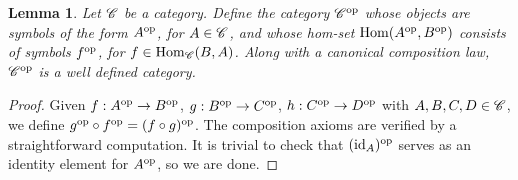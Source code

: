 \documentclass{article}
\newtheorem{lemma}{Lemma}[section]
\theoremstyle{definition}
\numberwithin{figure}{section}
\begin{document}
\begin{lemma} Let $\mathscr{C}$ be a category. Define the category $\mathscr{C}^{\mathrm{op}}$ whose objects are symbols of the form $A^{\mathrm{op}}$, for $A\in \mathscr{C}$, and whose hom-set $\mathrm{Hom}(A^{\mathrm{op}},B^{\mathrm{op}})$ consists of symbols $f^{\mathrm{op}}$, for $f\in \mathrm{Hom}_{\mathscr{C}}(B,A)$. Along with a canonical composition law, $\mathscr{C}^{\mathrm{op}}$ is a well defined category.
\end{lemma}
\begin{proof} Given $f:A^{\mathrm{op}}\to B^{\mathrm{op}}$, $g:B^{\mathrm{op}}\to C^{\mathrm{op}}$, $h:C^{\mathrm{op}}\to D^{\mathrm{op}}$ with $A,B,C,D\in \mathscr{C}$, we define $g^{\mathrm{op}}\circ f^{\mathrm{op}}=(f\circ g)^{\mathrm{op}}$. The composition axioms are verified by a straightforward computation. It is trivial to check that $(\mathrm{id}_A)^{\mathrm{op}}$ serves as an identity element for $A^{\mathrm{op}}$, so we are done.
\end{proof}
\end{document}
